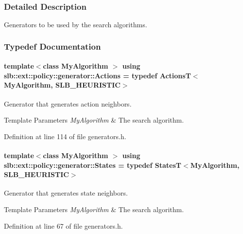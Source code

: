 \subsubsection{Detailed Description}
Generators to be used by the search algorithms. 

\subsubsection{Typedef Documentation}
\paragraph[{\texorpdfstring{Actions}{Actions}}]{\setlength{\rightskip}{0pt plus 5cm}template$<$class My\+Algorithm $>$ using {\bf slb\+::ext\+::policy\+::generator\+::\+Actions} = typedef {\bf ActionsT}$<$My\+Algorithm, S\+L\+B\+\_\+\+H\+E\+U\+R\+I\+S\+T\+IC$>$}\hypertarget{namespaceslb_1_1ext_1_1policy_1_1generator_aa810b71d654db732e5433be0f4baf4fa}{}\label{namespaceslb_1_1ext_1_1policy_1_1generator_aa810b71d654db732e5433be0f4baf4fa}


Generator that generates action neighbors. 


\begin{DoxyTemplParams}{Template Parameters}
{\em My\+Algorithm} & The search algorithm. \\
\hline
\end{DoxyTemplParams}


Definition at line 114 of file generators.\+h.

\paragraph[{\texorpdfstring{States}{States}}]{\setlength{\rightskip}{0pt plus 5cm}template$<$class My\+Algorithm $>$ using {\bf slb\+::ext\+::policy\+::generator\+::\+States} = typedef {\bf StatesT}$<$My\+Algorithm, S\+L\+B\+\_\+\+H\+E\+U\+R\+I\+S\+T\+IC$>$}\hypertarget{namespaceslb_1_1ext_1_1policy_1_1generator_a712500d6a77d98fdbc9baace652dc5ee}{}\label{namespaceslb_1_1ext_1_1policy_1_1generator_a712500d6a77d98fdbc9baace652dc5ee}


Generator that generates state neighbors. 


\begin{DoxyTemplParams}{Template Parameters}
{\em My\+Algorithm} & The search algorithm. \\
\hline
\end{DoxyTemplParams}


Definition at line 67 of file generators.\+h.

